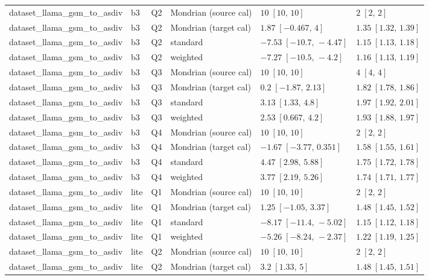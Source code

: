 \begin{longtable}{@{}p{}p{}p{}p{}p{}p{}@{}}
dataset\_llama\_gsm\_to\_asdiv & b3 & Q2 & Mondrian (source cal) & $10\;[10,\,10]$ & $2\;[2,\,2]$ \\
dataset\_llama\_gsm\_to\_asdiv & b3 & Q2 & Mondrian (target cal) & $1.87\;[-0.467,\,4]$ & $1.35\;[1.32,\,1.39]$ \\
dataset\_llama\_gsm\_to\_asdiv & b3 & Q2 & standard & $-7.53\;[-10.7,\,-4.47]$ & $1.15\;[1.13,\,1.18]$ \\
dataset\_llama\_gsm\_to\_asdiv & b3 & Q2 & weighted & $-7.27\;[-10.5,\,-4.2]$ & $1.16\;[1.13,\,1.19]$ \\
dataset\_llama\_gsm\_to\_asdiv & b3 & Q3 & Mondrian (source cal) & $10\;[10,\,10]$ & $4\;[4,\,4]$ \\
dataset\_llama\_gsm\_to\_asdiv & b3 & Q3 & Mondrian (target cal) & $0.2\;[-1.87,\,2.13]$ & $1.82\;[1.78,\,1.86]$ \\
dataset\_llama\_gsm\_to\_asdiv & b3 & Q3 & standard & $3.13\;[1.33,\,4.8]$ & $1.97\;[1.92,\,2.01]$ \\
dataset\_llama\_gsm\_to\_asdiv & b3 & Q3 & weighted & $2.53\;[0.667,\,4.2]$ & $1.93\;[1.88,\,1.97]$ \\
dataset\_llama\_gsm\_to\_asdiv & b3 & Q4 & Mondrian (source cal) & $10\;[10,\,10]$ & $2\;[2,\,2]$ \\
dataset\_llama\_gsm\_to\_asdiv & b3 & Q4 & Mondrian (target cal) & $-1.67\;[-3.77,\,0.351]$ & $1.58\;[1.55,\,1.61]$ \\
dataset\_llama\_gsm\_to\_asdiv & b3 & Q4 & standard & $4.47\;[2.98,\,5.88]$ & $1.75\;[1.72,\,1.78]$ \\
dataset\_llama\_gsm\_to\_asdiv & b3 & Q4 & weighted & $3.77\;[2.19,\,5.26]$ & $1.74\;[1.71,\,1.77]$ \\
dataset\_llama\_gsm\_to\_asdiv & lite & Q1 & Mondrian (source cal) & $10\;[10,\,10]$ & $2\;[2,\,2]$ \\
dataset\_llama\_gsm\_to\_asdiv & lite & Q1 & Mondrian (target cal) & $1.25\;[-1.05,\,3.37]$ & $1.48\;[1.45,\,1.52]$ \\
dataset\_llama\_gsm\_to\_asdiv & lite & Q1 & standard & $-8.17\;[-11.4,\,-5.02]$ & $1.15\;[1.12,\,1.18]$ \\
dataset\_llama\_gsm\_to\_asdiv & lite & Q1 & weighted & $-5.26\;[-8.24,\,-2.37]$ & $1.22\;[1.19,\,1.25]$ \\
dataset\_llama\_gsm\_to\_asdiv & lite & Q2 & Mondrian (source cal) & $10\;[10,\,10]$ & $2\;[2,\,2]$ \\
dataset\_llama\_gsm\_to\_asdiv & lite & Q2 & Mondrian (target cal) & $3.2\;[1.33,\,5]$ & $1.48\;[1.45,\,1.51]$ \\

\end{longtable}
